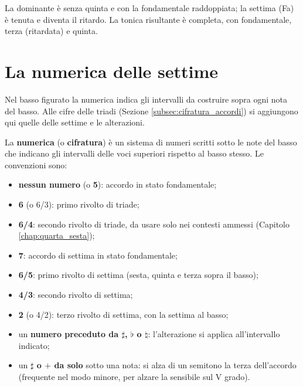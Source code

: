 \begin{esempio}
	\label{ex:ritardo_incompleto_maggiore}
	La dominante è senza quinta e con la fondamentale raddoppiata; la settima (Fa) è tenuta e diventa il ritardo. La tonica risultante è completa, con fondamentale, terza (ritardata) e quinta.
\end{esempio}

\begin{esempio}
	\label{ex:ritardo_completo_minore}
\end{esempio}

\begin{esempio}
	\label{ex:ritardo_incompleto_minore}
\end{esempio}

\section{La numerica delle settime}
\label{sec:lettura_numerica}

Nel basso figurato la numerica indica gli intervalli da costruire sopra ogni nota del basso. Alle cifre delle triadi (Sezione \ref{subsec:cifratura_accordi}) si aggiungono qui quelle delle settime e le alterazioni.

\begin{definizione}
	\label{def:numerica}
	La \textbf{numerica} (o \textbf{cifratura}) è un sistema di numeri scritti sotto le note del basso che indicano gli intervalli delle voci superiori rispetto al basso stesso. Le convenzioni sono:
	\begin{itemize}
		\item \textbf{nessun numero} (o \textbf{5}): accordo in stato fondamentale;
		\item \textbf{6} (o 6/3): primo rivolto di triade;
		\item \textbf{6/4}: secondo rivolto di triade, da usare solo nei contesti ammessi (Capitolo \ref{chap:quarta_sesta});
		\item \textbf{7}: accordo di settima in stato fondamentale;
		\item \textbf{6/5}: primo rivolto di settima (sesta, quinta e terza sopra il basso);
		\item \textbf{4/3}: secondo rivolto di settima;
		\item \textbf{2} (o 4/2): terzo rivolto di settima, con la settima al basso;
		\item un \textbf{numero preceduto da $\sharp$, $\flat$ o $\natural$}: l'alterazione si applica all'intervallo indicato;
		\item un \textbf{$\sharp$ o $+$ da solo} sotto una nota: si alza di un semitono la terza dell'accordo (frequente nel modo minore, per alzare la sensibile sul V grado).
	\end{itemize}
\end{definizione}

